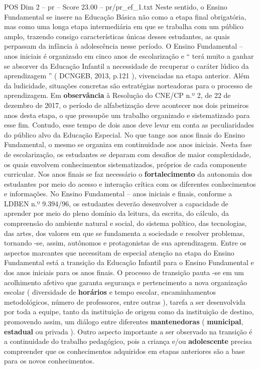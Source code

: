 \begin{textsample}{POS Dim 2 – pr – Score 23.00 – pr/pr\_ef\_1.txt}
Neste sentido, o Ensino Fundamental se insere na Educação Básica não como a etapa final obrigatória, mas como uma longa etapa intermediária em que se trabalha com um público amplo, trazendo consigo características únicas desses estudantes, as quais perpassam da infância à adolescência nesse período.
O Ensino Fundamental – anos iniciais é organizado em cinco anos de escolarização e “ terá muito a ganhar se absorver da Educação Infantil a necessidade de recuperar o caráter lúdico da aprendizagem ” ( DCNGEB, 2013, p.121 ), vivenciadas na etapa anterior.
Além da ludicidade, situações concretas são estratégias norteadoras para o processo de aprendizagem.
Em \textbf{observância} à Resolução do CNE/CP n.º 2, de 22 de dezembro de 2017, o período de alfabetização deve acontecer nos dois primeiros anos desta etapa, o que pressupõe um trabalho organizado e sistematizado para esse fim.
Contudo, esse tempo de dois anos deve levar em conta as peculiaridades do público alvo da Educação Especial.
No que tange aos anos finais do Ensino Fundamental, o mesmo se organiza em continuidade aos anos iniciais.
Nesta fase de escolarização, os estudantes se deparam com desafios de maior complexidade, os quais envolvem conhecimentos sistematizados, próprios de cada componente curricular.
Nos anos finais se faz necessário o \textbf{fortalecimento} da autonomia dos estudantes por meio do acesso e interação crítica com os diferentes conhecimentos e informações.
No Ensino Fundamental – anos iniciais e finais, conforme a LDBEN n.º 9.394/96, os estudantes deverão desenvolver a capacidade de aprender por meio do pleno domínio da leitura, da escrita, do cálculo, da compreensão do ambiente natural e social, do sistema político, das tecnologias, das artes, dos valores em que se fundamenta a sociedade e resolver problemas, tornando -se, assim, autônomos e protagonistas de sua aprendizagem.
Entre os aspectos marcantes que necessitam de especial atenção na etapa do Ensino Fundamental está a transição da Educação Infantil para o Ensino Fundamental e dos anos iniciais para os anos finais.
O processo de transição pauta -se em um acolhimento afetivo que garanta segurança e pertencimento a nova organização escolar ( diversidade de \textbf{horários} e tempo escolar, encaminhamentos metodológicos, número de professores, entre outras ), tarefa a ser desenvolvida por toda a equipe, tanto da instituição de origem como da instituição de destino, promovendo assim, um diálogo entre diferentes \textbf{mantenedoras} ( \textbf{municipal}, \textbf{estadual} ou privada ).
Outro aspecto importante a ser observado na transição é a continuidade do trabalho pedagógico, pois a criança e/ou \textbf{adolescente} precisa compreender que os conhecimentos adquiridos em etapas anteriores são a base para os novos conhecimentos.

\end{textsample}
